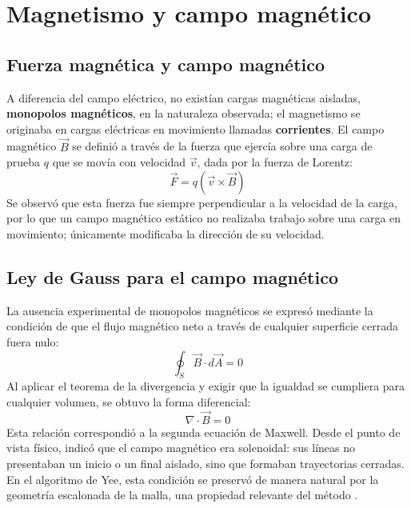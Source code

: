 \section{Magnetismo y campo magnético}

\subsection{Fuerza magnética y campo magnético}
A diferencia del campo eléctrico, no existían cargas magnéticas aisladas, \textbf{monopolos magnéticos}, en la naturaleza observada; el magnetismo se originaba en cargas eléctricas en movimiento llamadas \textbf{corrientes}. El campo magnético $\vec{B}$ se definió a través de la fuerza que ejercía sobre una carga de prueba $q$ que se movía con velocidad $\vec{v}$, dada por la fuerza de Lorentz:
\begin{equation}
    \vec{F} = q(\vec{v} \times \vec{B})
\end{equation}
Se observó que esta fuerza fue siempre perpendicular a la velocidad de la carga, por lo que un campo magnético estático no realizaba trabajo sobre una carga en movimiento; únicamente modificaba la dirección de su velocidad.

\subsection{Ley de Gauss para el campo magnético}
La ausencia experimental de monopolos magnéticos se expresó mediante la condición de que el flujo magnético neto a través de cualquier superficie cerrada fuera nulo:
\begin{equation}
    \oint_S \vec{B} \cdot d\vec{A} = 0
\end{equation}
Al aplicar el teorema de la divergencia y exigir que la igualdad se cumpliera para cualquier volumen, se obtuvo la forma diferencial:
\begin{equation}
    \nabla \cdot \vec{B} = 0
\end{equation}
Esta relación correspondió a la segunda ecuación de Maxwell. Desde el punto de vista físico, indicó que el campo magnético era solenoidal: sus líneas no presentaban un inicio o un final aislado, sino que formaban trayectorias cerradas. En el algoritmo de Yee, esta condición se preservó de manera natural por la geometría escalonada de la malla, una propiedad relevante del método \cite{Teixeira2023}.

